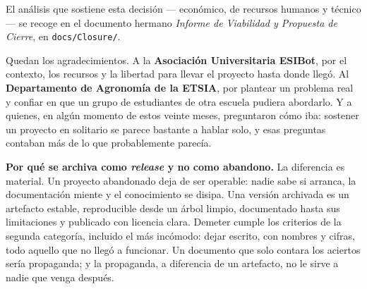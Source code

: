 El análisis que sostiene esta decisión --- económico, de recursos humanos y técnico
--- se recoge en el documento hermano \textit{Informe de Viabilidad y Propuesta de
Cierre}, en \texttt{docs/Closure/}.

Quedan los agradecimientos. A la \textbf{Asociación Universitaria ESIBot}, por el
contexto, los recursos y la libertad para llevar el proyecto hasta donde llegó. Al
\textbf{Departamento de Agronomía de la ETSIA}, por plantear un problema real y
confiar en que un grupo de estudiantes de otra escuela pudiera abordarlo. Y a
quienes, en algún momento de estos veinte meses, preguntaron cómo iba: sostener un
proyecto en solitario se parece bastante a hablar solo, y esas preguntas contaban
más de lo que probablemente parecía.

\begin{designnote}
\textbf{Por qué se archiva como \textit{release} y no como abandono.} La diferencia
es material. Un proyecto abandonado deja de ser operable: nadie sabe si arranca, la
documentación miente y el conocimiento se disipa. Una versión archivada es un
artefacto estable, reproducible desde un árbol limpio, documentado hasta sus
limitaciones y publicado con licencia clara. Demeter cumple los criterios de la
segunda categoría, incluido el más incómodo: dejar escrito, con nombres y cifras,
todo aquello que no llegó a funcionar. Un documento que solo contara los aciertos
sería propaganda; y la propaganda, a diferencia de un artefacto, no le sirve a
nadie que venga después.
\end{designnote}
